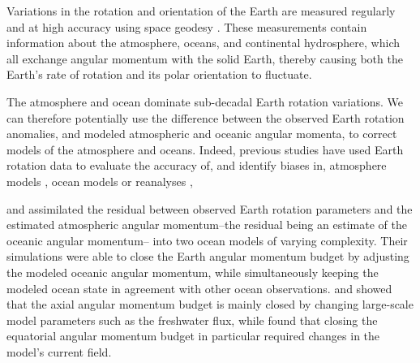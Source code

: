 
Variations in the rotation and orientation of the Earth are measured regularly and at high accuracy using space geodesy \citep{Gross1992,iers}. 
These measurements contain information about the atmosphere, oceans, and continental hydrosphere, which all exchange angular momentum with the solid Earth, thereby causing both the Earth's rate of rotation and its polar orientation to fluctuate. 

The atmosphere and ocean dominate sub-decadal Earth rotation variations. 
We can therefore potentially use the difference between the observed Earth rotation anomalies, and modeled atmospheric and oceanic angular momenta, to correct models of the atmosphere and oceans. 
Indeed, previous studies have used Earth rotation data to evaluate the accuracy of, 
and identify biases in, atmosphere models \citep{Boer1990, Rosen2000}, ocean 
models \citep{Gross1996a} or reanalyses \citep{Yu1999, Aoyama2000, 
Paek2012a,Berrisford2011},

\citet{Saynisch2010,Saynisch2011} and \citet{Saynisch2012} assimilated the residual between observed Earth rotation parameters and the estimated atmospheric angular momentum--the residual being an estimate of the oceanic angular momentum-- into two ocean models of varying complexity. 
Their simulations were able to close the Earth angular momentum budget by adjusting the modeled oceanic angular momentum, while simultaneously keeping the modeled ocean state in agreement with other ocean observations.  
\citet{Saynisch2010} and \citet{Saynisch2012} showed that the axial angular momentum budget is mainly closed by changing large-scale model parameters such as the freshwater flux, while \citet{Saynisch2011} found that closing the equatorial angular momentum budget in particular required changes in the model's current field. 

